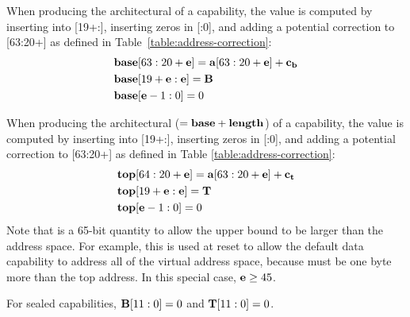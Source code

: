 When producing the architectural \cbase{} of a capability, the value is computed by inserting \cB{} into \caddr{}[19+\cexponent{}:\cexponent{}], inserting zeros in \caddr{}[:0], and adding a potential correction \cbasecorrection{} to \caddr{}[63:20+\cexponent{}] as defined in Table~\ref{table:address-correction}:
\begin{align*}
&{\bf base}{}[63:20+{\bf e}{}] = {\bf a}{}[63:20+{\bf e}{}]+\textbf{c\textsubscript{b}}{}\\
&{\bf base}{}[19+{\bf e}{}:{\bf e}{}] = {\bf B}{}\\
&{\bf base}{}[{\bf e}{}-1:0] = 0
\end{align*}

When producing the architectural \ctop{} ($={\bf base}{}+{\bf length}{}$) of a
capability, the value is computed by inserting \cT{} into
\caddr{}[19+\cexponent{}:\cexponent{}], inserting zeros in
\caddr{}[:0], and adding a potential correction
\ctopcorrection{} to \caddr{}[63:20+\cexponent{}] as defined in Table
\ref{table:address-correction}:
\begin{align*}
&{\bf top}{}[64:20+{\bf e}{}] = {\bf a}{}[63:20+{\bf e}{}]+\textbf{c\textsubscript{t}}{}\\
&{\bf top}{}[19+{\bf e}{}:{\bf e}{}] = {\bf T}{}\\
&{\bf top}{}[{\bf e}{}-1:0] = 0
\end{align*}
Note that \ctop{} is a 65-bit quantity to allow the upper bound to be
larger than the address space.  For example, this is used at reset
to allow the default data capability to address all of the virtual
address space, because \ctop{} must be one byte more than the top
address.  In this special case, ${\bf e}{} \geq 45$.

For sealed capabilities, ${\bf B}{}[11:0] = 0$ and ${\bf T}{}[11:0] = 0$.

